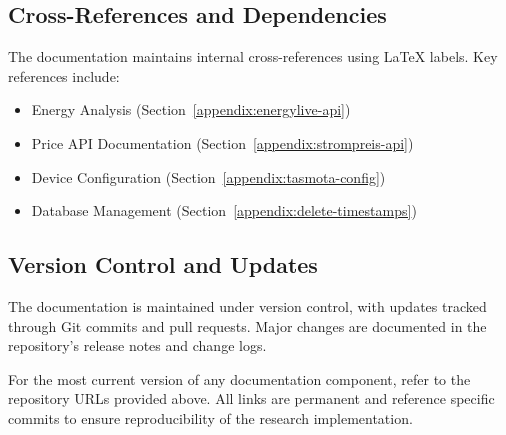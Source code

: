 \subsection{Cross-References and Dependencies}
The documentation maintains internal cross-references using LaTeX labels. Key references include:
\begin{itemize}
    \item Energy Analysis (Section~\ref{appendix:energylive-api})
    \item Price API Documentation (Section~\ref{appendix:strompreis-api})
    \item Device Configuration (Section~\ref{appendix:tasmota-config})
    \item Database Management (Section~\ref{appendix:delete-timestamps})
\end{itemize}

\subsection{Version Control and Updates}
The documentation is maintained under version control, with updates tracked through Git commits and pull requests. Major changes are documented in the repository's release notes and change logs.

For the most current version of any documentation component, refer to the repository URLs provided above. All links are permanent and reference specific commits to ensure reproducibility of the research implementation.
